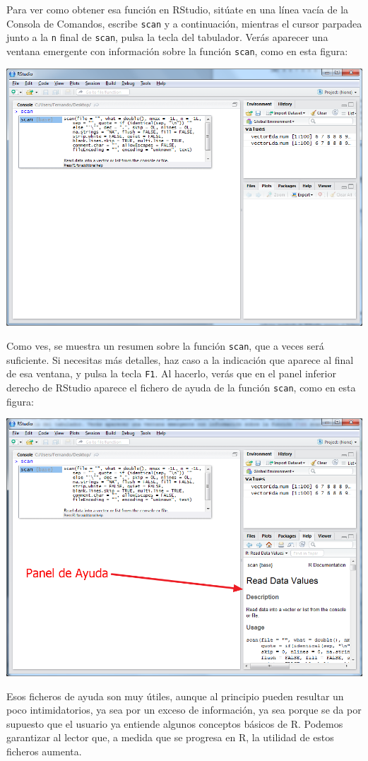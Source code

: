 \documentclass[10pt,a4paper]{article}\usepackage[]{graphicx}\usepackage[]{color}
\newcounter {cont01}
\begin{document}
Para ver como obtener esa función en RStudio, sitúate en una línea vacía de la Consola de Comandos, escribe {\tt scan} y a continuación, mientras el cursor parpadea junto a la {\tt n} final de {\tt scan}, pulsa la tecla del tabulador. Verás aparecer una ventana emergente con información sobre la función {\tt scan}, como en esta figura:
    \begin{center}
    \includegraphics[width=15cm]{../fig/Tut02-08.png}
    \end{center}
Como ves, se muestra un resumen sobre la función {\tt scan}, que a veces será suficiente. Si necesitas más detalles, haz caso a la indicación que aparece al final de esa ventana, y pulsa la tecla {\tt F1}. Al hacerlo, verás que en el panel inferior derecho de RStudio aparece el {\sf fichero de ayuda} de la función {\tt scan}, como en esta figura:
    \begin{center}
    \includegraphics[width=14cm]{../fig/Tut02-09.png}
    \end{center}
Esos ficheros de ayuda son muy útiles, aunque al principio pueden resultar un poco intimidatorios, ya sea por un exceso de información, ya sea porque se da por supuesto que el usuario ya entiende algunos conceptos básicos de R. Podemos garantizar al lector que, a medida que se progresa en R, la utilidad de estos ficheros aumenta.
\end{document}
